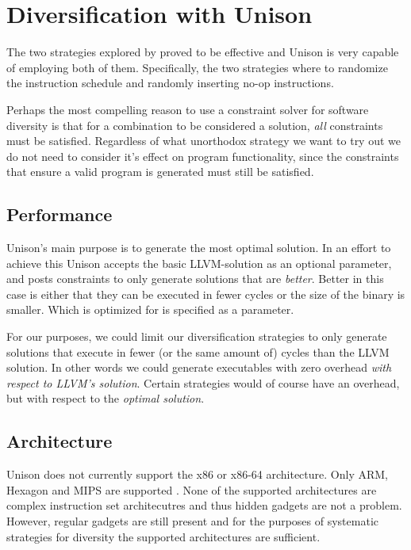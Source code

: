 \chapter{Diversification with Unison}

The two strategies explored by \textcite{large-scale-automated} proved to be
effective and Unison is very capable of employing both of them. Specifically, the two
strategies where to randomize the instruction schedule and randomly inserting no-op
instructions.

Perhaps the most compelling reason to use a constraint solver for software diversity is that
for a combination to be considered a solution, \textit{all} constraints must be satisfied.
Regardless of what unorthodox strategy we want to try out we do not need to consider it's
effect on program functionality, since the constraints that ensure a valid program is
generated must still be satisfied.



\section{Performance}

Unison's main purpose is to generate the most optimal solution. In an effort to achieve 
this Unison accepts the basic LLVM-solution as an optional parameter, and posts constraints
to only generate solutions that are \textit{better}. Better in this case is either that
they can be executed in fewer cycles or the size of the binary is smaller. Which is optimized
for is specified as a parameter.

For our purposes, we could limit our diversification strategies to only generate solutions
that execute in fewer (or the same amount of) cycles than the LLVM solution. In other words
we could generate executables with zero overhead \textit{with respect to LLVM's solution}.
Certain strategies would of course have an overhead, but with respect to the \textit{optimal
solution}.

\section{Architecture}

Unison does not currently support the x86 or x86-64 architecture. Only ARM, Hexagon and MIPS
are supported \cite{unison-src}. None of the supported architectures are complex instruction
set architecutres and thus hidden gadgets are not a problem. However, regular gadgets are
still present and for the purposes of systematic strategies for diversity the supported
architectures are sufficient.
